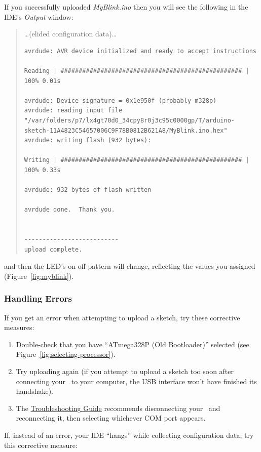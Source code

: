If you successfully uploaded \textit{MyBlink.ino} then you will see the
following in the IDE's \textit{Output} window:
\begin{quote}
\dots (elided configuration data)\dots
\begin{verbatim}
avrdude: AVR device initialized and ready to accept instructions

Reading | ################################################## | 100% 0.01s

avrdude: Device signature = 0x1e950f (probably m328p)
avrdude: reading input file "/var/folders/p7/lx4gt70d0_34cpy8r0j3c95c0000gp/T/arduino-sketch-11A4823C54657006C9F78B0812B621A8/MyBlink.ino.hex"
avrdude: writing flash (932 bytes):

Writing | ################################################## | 100% 0.33s

avrdude: 932 bytes of flash written

avrdude done.  Thank you.


--------------------------
upload complete.
\end{verbatim}\end{quote}
and then the LED's on-off pattern will change, reflecting the 
values you assigned (Figure~\ref{fig:myblink}).

\subsubsection*{Handling Errors}

If you get an error when attempting to upload a sketch, try these corrective
measures:

\begin{enumerate}
    \item Double-check that you have ``ATmega328P (Old Bootloader)'' selected
        (see Figure~\ref{fig:selecting-processor}).
    \item Try uploading again (if you attempt to upload a sketch too soon after
        connecting your \nano\ to your computer, the USB interface won't have
        finished its handshake).
    \item The \href{https://support.arduino.cc/hc/en-us/articles/4401874331410--Error-avrdude-when-uploading}{Troubleshooting
        Guide} recommends disconnecting your \nano\ and reconnecting it, then
        selecting whichever COM port appears.
\end{enumerate}

If, instead of an error, your IDE ``hangs'' while collecting configuration data, try this corrective measure:

